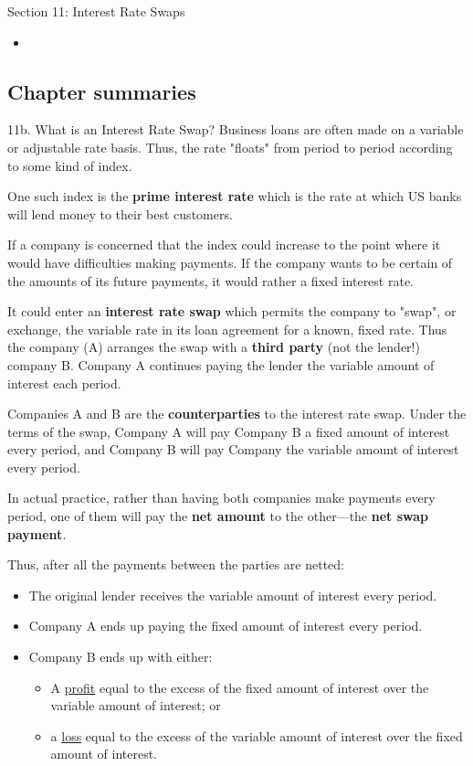 \begin{ASM_chapter}
Section 11: Interest Rate Swaps
\begin{itemize}[leftmargin = *]
	\item	{}
\end{itemize}
\end{ASM_chapter}

\subsection{Chapter summaries}

\begin{CHPT_SUMM_AUTO}[label = {L.-11b}]{11b. What is an Interest Rate Swap?}
Business loans are often made on a variable or adjustable rate basis.
Thus, the rate "floats" from period to period according to some kind of index.

One such index is the \textbf{prime interest rate} which is the rate at which US banks will lend money to their best customers.

If a company is concerned that the index could increase to the point where it would have difficulties making payments. 
If the company wants to be certain of the amounts of its future payments, it would rather a fixed interest rate. 

It could enter an \textbf{interest rate swap} which permits the company to "swap", or exchange, the variable rate in its loan agreement for a known, fixed rate. 
Thus the company (A) arranges the swap with a \textbf{third party} (not the lender!) company B. Company A continues paying the lender the variable amount of interest each period.

Companies A and B are the \textbf{counterparties} to the interest rate swap. 
Under the terms of the swap, Company A will pay Company B a fixed amount of interest every period, and Company B will pay Company the variable amount of interest every period.

In actual practice, rather than having both companies make payments every period, one of them will pay the \textbf{net amount} to the other---the \textbf{net swap payment}.

Thus, after all the payments between the parties are netted:
\begin{itemize}[leftmargin = *]
	\item	The original lender receives the variable amount of interest every period.
	\item	Company A ends up paying the fixed amount of interest every period.
	\item	Company B ends up with either:
		\begin{itemize}[leftmargin = *]
		\item	A \underline{profit} equal to the excess of the fixed amount of interest over the variable amount of interest; or
		\item	a \underline{loss} equal to the excess of the variable amount of interest over the fixed amount of interest.
		\end{itemize}
\end{itemize}



\end{CHPT_SUMM_AUTO}
